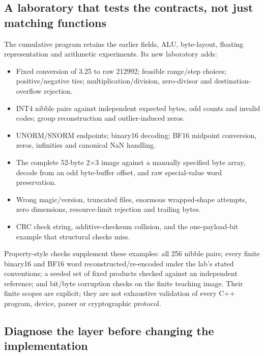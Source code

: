 \subsection{A laboratory that tests the contracts, not just matching functions}\label{01-foundations-i-ch002-a-laboratory-that-tests-the-contracts-not-just-matching-functions}

\hypertarget{01-foundations-i-ch002-a-laboratory-that-tests-the-contracts-not-just-matching-functions}{}

The cumulative program retains the earlier fields, ALU, byte-layout, floating representation and arithmetic experiments. Its new laboratory adds:

\begin{itemize}
\tightlist
\item
  Fixed conversion of 3.25 to raw 212992; feasible range/step choices; positive/negative ties; multiplication/division, zero-divisor and destination-overflow rejection.
\item
  INT4 nibble pairs against independent expected bytes, odd counts and invalid codes; group reconstruction and outlier-induced zeros.
\item
  UNORM/SNORM endpoints; binary16 decoding; BF16 midpoint conversion, zeros, infinities and canonical NaN handling.
\item
  The complete 52-byte 2×3 image against a manually specified byte array, decode from an odd byte-buffer offset, and raw special-value word preservation.
\item
  Wrong magic/version, truncated files, enormous wrapped-shape attempts, zero dimensions, resource-limit rejection and trailing bytes.
\item
  CRC check string, additive-checksum collision, and the one-payload-bit example that structural checks miss.
\end{itemize}

Property-style checks supplement these examples: all 256 nibble pairs; every finite binary16 and BF16 word reconstructed/re-encoded under the lab's stated conventions; a seeded set of fixed products checked against an independent reference; and bit/byte corruption checks on the finite teaching image. Their finite scopes are explicit; they are not exhaustive validation of every C++ program, device, parser or cryptographic protocol.

\subsection{Diagnose the layer before changing the implementation}\label{01-foundations-i-ch002-diagnose-the-layer-before-changing-the-implementation}

